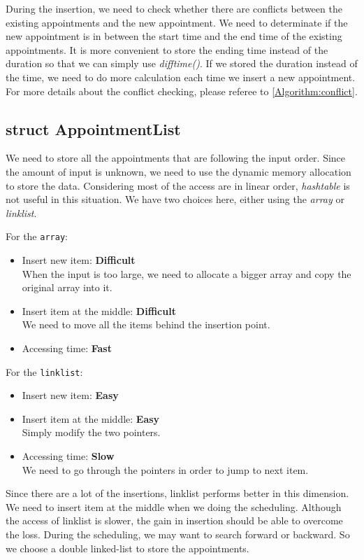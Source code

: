 \documentclass[12pt,a4paper]{report}
\begin{document}
During the insertion, we need to check whether there are conflicts between the existing appointments and the new appointment. We need to determinate if the new appointment is in between the start time and the end time of the existing appointments. It is more convenient to store the ending time instead of the duration so that we can simply use \textit{difftime()}. If we stored the duration instead of the time, we need to do more calculation each time we insert a new appointment. For more details about the conflict checking, please referee to \autoref{Algorithm:conflict}.

\subsection{struct AppointmentList}
We need to store all the appointments that are following the input order. Since the amount of input is unknown, we need to use the dynamic memory allocation to store the data. Considering most of the access are in linear order, \textit{hashtable} is not useful in this situation. We have two choices here, either using the \textit{array} or \textit{linklist}.

For the \texttt{array}:
\begin{itemize}
\item Insert new item: \textbf{Difficult} \\ When the input is too large, we need to allocate a bigger array and copy the original array into it.
\item Insert item at the middle: \textbf{Difficult} \\ We need to move all the items behind the insertion point.
\item Accessing time: \textbf{Fast}
\end{itemize}

For the \texttt{linklist}:
\begin{itemize}
\item Insert new item: \textbf{Easy}
\item Insert item at the middle: \textbf{Easy} \\ Simply modify the two pointers.
\item Accessing time: \textbf{Slow} \\ We need to go through the pointers in order to jump to next item.
\end{itemize}

Since there are a lot of the insertions, linklist performs better in this dimension. We need to insert item at the middle when we doing the scheduling. Although the access of linklist is slower, the gain in insertion should be able to overcome the loss. During the scheduling, we may want to search forward or backward. So we choose a double linked-list to store the appointments.
\end{document}
